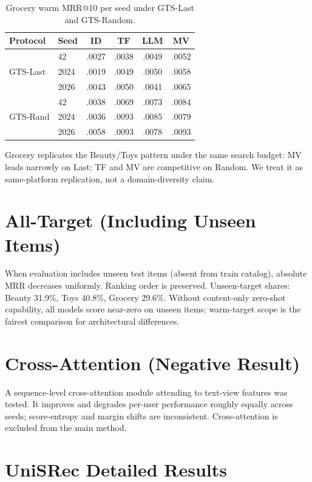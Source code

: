 \documentclass[sigconf,natbib=true,anonymous]{acmart}
\begin{document}
\begin{table}[h]
\centering
\caption{Grocery warm MRR@10 per seed under GTS-Last and GTS-Random.}
\label{tab:grocery-perseed}
\small
\setlength{\tabcolsep}{3pt}
\begin{tabular}{@{}llcccc@{}}
\toprule
Protocol & Seed & ID & TF & LLM & MV \\
\midrule
\multirow{3}{*}{GTS-Last}
 & 42    & .0027 & .0038 & .0049 & .0052 \\
 & 2024  & .0019 & .0049 & .0050 & .0058 \\
 & 2026  & .0043 & .0050 & .0041 & .0065 \\
\midrule
\multirow{3}{*}{GTS-Rand}
 & 42    & .0038 & .0069 & .0073 & .0084 \\
 & 2024  & .0036 & .0093 & .0085 & .0079 \\
 & 2026  & .0058 & .0093 & .0078 & .0093 \\
\bottomrule
\end{tabular}
\end{table}

Grocery replicates the Beauty/Toys pattern under the same search budget: MV leads narrowly on Last; TF and MV are competitive on Random.
We treat it as same-platform replication, not a domain-diversity claim.

\section{All-Target (Including Unseen Items)}
\label{app:alltarget}

When evaluation includes unseen test items (absent from train catalog), absolute MRR decreases uniformly.
Ranking order is preserved.
Unseen-target shares: Beauty 31.9\%, Toys 40.8\%, Grocery 29.6\%.
Without content-only zero-shot capability, all models score near-zero on unseen items; warm-target scope is the fairest comparison for architectural differences.

\section{Cross-Attention (Negative Result)}
\label{app:cross}

A sequence-level cross-attention module attending to text-view features was tested.
It improves and degrades per-user performance roughly equally across seeds; score-entropy and margin shifts are inconsistent.
Cross-attention is excluded from the main method.

\section{UniSRec Detailed Results}
\label{app:unisrec}
\end{document}
